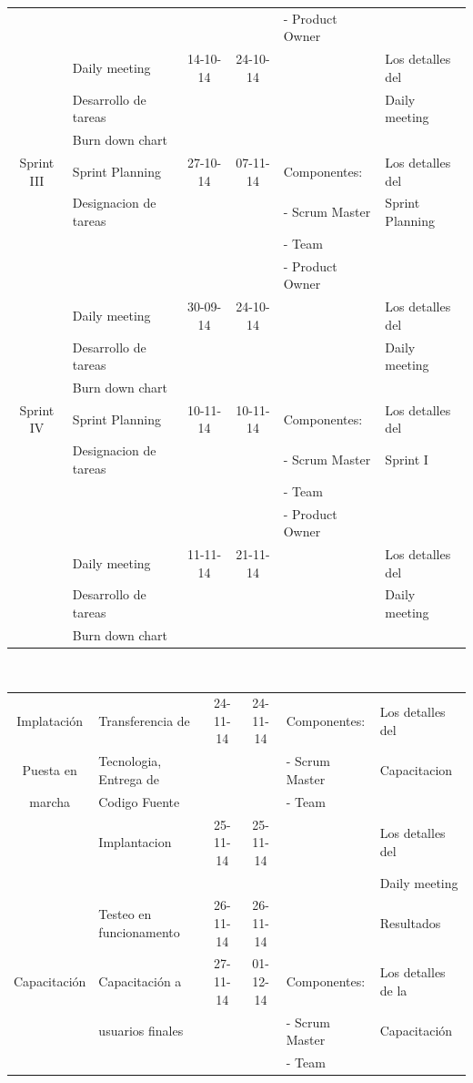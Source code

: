 \documentclass[11pt,letterpaper]{report}
\begin{document}
\begin{tabular}{|c|p{4cm}|c|c|l|p{3cm}|}
	& & & & - Product Owner & \\
	\cline{2-4} \cline{6-6}
	& Daily meeting & 14-10-14 & 24-10-14 & & Los detalles del  \\ 
	& Desarrollo de tareas &&&& Daily meeting\\
	& Burn down chart &&&& \\
	\hline %
	Sprint III& Sprint Planning & 27-10-14 & 07-11-14 &  Componentes: & Los detalles del \\
	& Designacion de tareas &  &  & - Scrum Master & Sprint Planning \\
	& & & & - Team & \\
	& & & & - Product Owner & \\
	\cline{2-4} \cline{6-6}
	& Daily meeting & 30-09-14 & 24-10-14 & & Los detalles del  \\ 
	& Desarrollo de tareas &&&& Daily meeting\\
	& Burn down chart &&&& \\
	\hline %
	Sprint IV& Sprint Planning & 10-11-14 & 10-11-14 &  Componentes: & Los detalles del \\
	& Designacion de tareas &  &  & - Scrum Master & Sprint I \\
	& & & & - Team & \\
	& & & & - Product Owner & \\
	\cline{2-4} \cline{6-6}
	& Daily meeting & 11-11-14 & 21-11-14 & & Los detalles del  \\ 
	& Desarrollo de tareas &&&& Daily meeting\\
	& Burn down chart &&&& \\
	\hline %
	
\end{tabular}\\
\newpage
\begin{tabular}{|c|p{4cm}|c|c|l|p{3cm}|}
	\hline
	Implatación & Transferencia de & 24-11-14 & 24-11-14 &  Componentes: & Los detalles del \\
	Puesta en & Tecnologia, Entrega de &  &  & - Scrum Master & Capacitacion \\
	marcha& Codigo Fuente & & & - Team & \\
	\cline{2-4} \cline{6-6}
	& Implantacion & 25-11-14 & 25-11-14 & & Los detalles del  \\ 
	& &&&& Daily meeting\\
	\cline{2-4} \cline{6-6}
	& Testeo en funcionamento  & 26-11-14 & 26-11-14 && Resultados \\
	\hline %
	Capacitación & Capacitación a  & 27-11-14 & 01-12-14 &  Componentes: & Los detalles de la \\
	& usuarios finales &  &  & - Scrum Master & Capacitación \\
	& & & & - Team & \\
	\hline %
\end{tabular}
\end{document}

